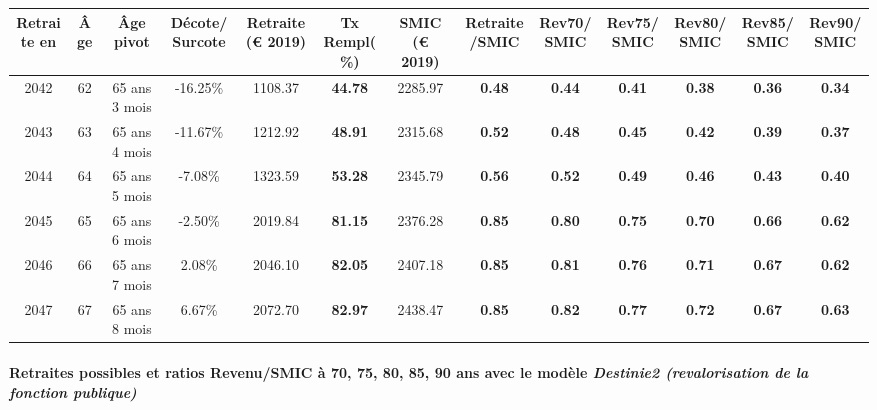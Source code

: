 { \scriptsize \begin{center} 
\begin{tabular}[htb]{|c|c||c|c||c|c||c||c|c|c|c|c|c|} 
\hline 
 Retraite en &  Âge &  Âge pivot &  Décote/Surcote &  Retraite (\euro{} 2019) &  Tx Rempl(\%) &  SMIC (\euro{} 2019) &  Retraite/SMIC &  Rev70/SMIC &  Rev75/SMIC &  Rev80/SMIC &  Rev85/SMIC &  Rev90/SMIC \\ 
\hline \hline 
 2042 &  62 &  65 ans 3 mois &  -16.25\% &  1108.37 &  {\bf 44.78} &  2285.97 &  {\bf {\color{red} 0.48}} &  {\bf {\color{red} 0.44}} &  {\bf {\color{red} 0.41}} &  {\bf {\color{red} 0.38}} &  {\bf {\color{red} 0.36}} &  {\bf {\color{red} 0.34}} \\ 
\hline 
 2043 &  63 &  65 ans 4 mois &  -11.67\% &  1212.92 &  {\bf 48.91} &  2315.68 &  {\bf {\color{red} 0.52}} &  {\bf {\color{red} 0.48}} &  {\bf {\color{red} 0.45}} &  {\bf {\color{red} 0.42}} &  {\bf {\color{red} 0.39}} &  {\bf {\color{red} 0.37}} \\ 
\hline 
 2044 &  64 &  65 ans 5 mois &  -7.08\% &  1323.59 &  {\bf 53.28} &  2345.79 &  {\bf {\color{red} 0.56}} &  {\bf {\color{red} 0.52}} &  {\bf {\color{red} 0.49}} &  {\bf {\color{red} 0.46}} &  {\bf {\color{red} 0.43}} &  {\bf {\color{red} 0.40}} \\ 
\hline 
 2045 &  65 &  65 ans 6 mois &  -2.50\% &  2019.84 &  {\bf 81.15} &  2376.28 &  {\bf {\color{red} 0.85}} &  {\bf {\color{red} 0.80}} &  {\bf {\color{red} 0.75}} &  {\bf {\color{red} 0.70}} &  {\bf {\color{red} 0.66}} &  {\bf {\color{red} 0.62}} \\ 
\hline 
 2046 &  66 &  65 ans 7 mois &  2.08\% &  2046.10 &  {\bf 82.05} &  2407.18 &  {\bf {\color{red} 0.85}} &  {\bf {\color{red} 0.81}} &  {\bf {\color{red} 0.76}} &  {\bf {\color{red} 0.71}} &  {\bf {\color{red} 0.67}} &  {\bf {\color{red} 0.62}} \\ 
\hline 
 2047 &  67 &  65 ans 8 mois &  6.67\% &  2072.70 &  {\bf 82.97} &  2438.47 &  {\bf {\color{red} 0.85}} &  {\bf {\color{red} 0.82}} &  {\bf {\color{red} 0.77}} &  {\bf {\color{red} 0.72}} &  {\bf {\color{red} 0.67}} &  {\bf {\color{red} 0.63}} \\ 
\hline 
\hline 
\end{tabular} 
\end{center} } 
\paragraph{Retraites possibles et ratios Revenu/SMIC à 70, 75, 80, 85, 90 ans avec le modèle \emph{Destinie2 (revalorisation de la fonction publique)}}  
 
